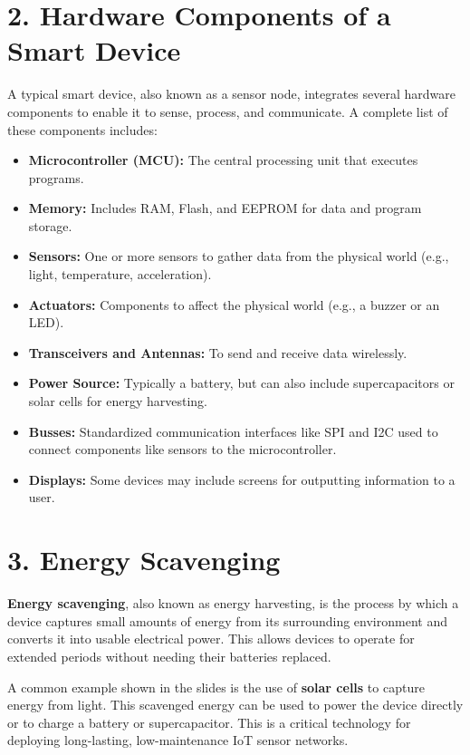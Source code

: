 \documentclass[a4paper,12pt]{article}
\begin{document}
\section*{2. Hardware Components of a Smart Device}

A typical smart device, also known as a sensor node, integrates several hardware components to enable it to sense, process, and communicate. A complete list of these components includes: 
\begin{itemize}
    \item \textbf{Microcontroller (MCU):} The central processing unit that executes programs.
    \item \textbf{Memory:} Includes RAM, Flash, and EEPROM for data and program storage.
    \item \textbf{Sensors:} One or more sensors to gather data from the physical world (e.g., light, temperature, acceleration).
    \item \textbf{Actuators:} Components to affect the physical world (e.g., a buzzer or an LED).
    \item \textbf{Transceivers and Antennas:} To send and receive data wirelessly.
    \item \textbf{Power Source:} Typically a battery, but can also include supercapacitors or solar cells for energy harvesting.
    \item \textbf{Busses:} Standardized communication interfaces like SPI and I2C used to connect components like sensors to the microcontroller.
    \item \textbf{Displays:} Some devices may include screens for outputting information to a user.
\end{itemize}

\section*{3. Energy Scavenging}

\textbf{Energy scavenging}, also known as energy harvesting, is the process by which a device captures small amounts of energy from its surrounding environment and converts it into usable electrical power. This allows devices to operate for extended periods without needing their batteries replaced. 

A common example shown in the slides is the use of \textbf{solar cells} to capture energy from light. This scavenged energy can be used to power the device directly or to charge a battery or supercapacitor. This is a critical technology for deploying long-lasting, low-maintenance IoT sensor networks. 
\end{document}
